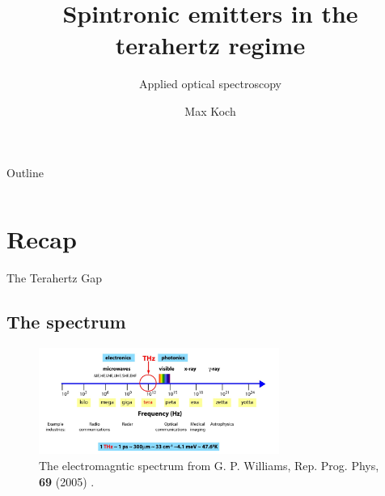 \documentclass[aspectratio=1610, 9pt]{beamer}
\title{Spintronic emitters in the terahertz regime}
\subtitle{Applied optical spectroscopy}
\author[M.~Koch]{Max Koch}
\institute[]{TU Dortmund \\  Fakultät Physik}
\begin{document}
\maketitle

\begin{frame}{Outline}
  \begin{columns}
    \begin{column}{.2\textwidth}
    \end{column}
    \begin{column}{.8\textwidth}
      \tableofcontents
    \end{column}
  \end{columns}
\end{frame}


\section{Recap}

\begin{frame}{The Terahertz Gap}
  \subsection{The spectrum}
  \begin{center}
    \begin{figure}
      \includegraphics[width=0.7\textwidth]{images/spectrum.png}
      \caption{\textcolor{tugreen}{The electromagntic spectrum} from G. P. Williams, Rep. Prog. Phys, \textbf{69} (2005) .}
      \nocite{spectrum_pic}
    \end{figure}
  \end{center}
\end{frame}
\end{document}
